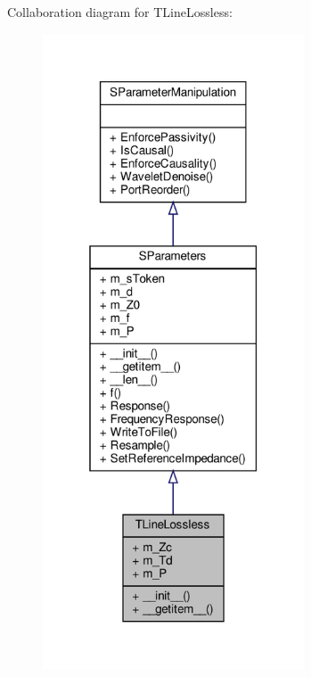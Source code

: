 Collaboration diagram for T\+Line\+Lossless\+:
\nopagebreak
\begin{figure}[H]
\begin{center}
\leavevmode
\includegraphics[width=220pt]{classSignalIntegrity_1_1SParameters_1_1Devices_1_1TLineLossless_1_1TLineLossless__coll__graph}
\end{center}
\end{figure}
